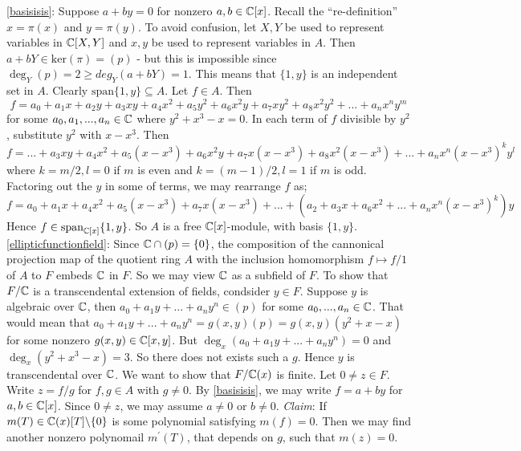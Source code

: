 \begin{solution}
	\eqref{basisisis}: Suppose $a+by = 0$ for nonzero $a,b \in \mathbb{C}[x]$. 
	Recall the ``re-definition'' $x = \pi(x)$ and $y = \pi(y)$. To 
	avoid confusion, let $X,Y$ be used to represent variables in 
	$\mathbb{C}[X,Y]$ and $x,y$ be used to represent variables in $A$. 
	Then $a+bY \in \text{ker}(\pi) = (p)$ - but this is impossible since 
	$\deg_Y(p) = 2 \geq deg_Y(a+bY) = 1$. This means that $\lbrace 1,y \rbrace$
	is an independent set in $A$. Clearly $\text{span} \lbrace 1,y \rbrace \subseteq A$.
	Let $f \in A$. Then $$f = a_0 + a_ 1x + a_2y + a_3xy + a_4 x^2 
	+ a_5y^2 + a_6x^2y + a_7xy^2 + a_8x^2y^2 + ... + a_nx^ny^m$$
	for some $a_0,a_1,...,a_n \in \mathbb{C}$ where $y^2+x^3 - x = 0$. 
	In each term of $f$ divisible by $y^2$, substitute $y^2$ with $x - x^3$. 
	Then $$f = ... + a_3xy + a_4 x^2 + a_5(x - x^3) + a_6x^2y + a_7x(x - x^3) 
	+ a_8x^2(x - x^3) + ... + a_nx^n(x - x^3)^ky^l$$
	where $k = m/2, l = 0$ if $m$ is even and $k = (m-1)/2, l = 1$ if $m$ is odd.
	Factoring out the $y$ in some of terms, we may rearrange $f$ as;
	$$f =  a_0 + a_ 1x +  a_4 x^2  + a_5(x - x^3)  + a_7x(x - x^3) + ... + 
	(a_2 +  a_3x  + a_6x^2 + ... +a_nx^n(x - x^3)^k)y $$
	Hence $f \in \text{span}_{\mathbb{C}[x]} \lbrace 1,y \rbrace$. 
	So $A$ is a free $\mathbb{C}[x]$-module, with basis $\{ 1, y \}$.\\

	\eqref{ellipticfunctionfield}: Since $\mathbb{C} \cap (p) = \lbrace 0 \rbrace $, 
	the composition of the cannonical projection map
	of the quotient ring $A$ with the inclusion homomorphism $f \mapsto f/1 $ of 
	$A$ to $F$ embeds $\mathbb{C} $ in $F$. So we may view $\mathbb{C} $ as a subfield of
	$F$. To show that $F/ \mathbb{C}$ is a transcendental extension of 
	fields, condsider $y\in F$. Suppose $y$ is algebraic over 
	$\mathbb{C} $, then $a_0 + a_1y + ... + a_ny^n \in (p)$ 
	for some $a_0,...,a_n \in \mathbb{C}$. That would mean 
	that $a_0 + a_1y + ... + a_ny^n = g(x,y)(p) = g(x,y)(y^2 + x - x)$ 
	for some nonzero $g(x,y) \in \mathbb{C}[x,y]$.
	But $\deg_x(a_0 + a_1y + ... + a_ny^n) = 0$ and 
	$\deg_x (y^2 +x^3 -x) = 3$. So there does not exists such a $g$.
	Hence $y$ is transcendental over $\mathbb{C}$.
	We want to show that $F/\mathbb{C}(x)$ is finite.
	Let $0 \neq z \in F$. Write $z = f/g$ for $f,g\in A$ with $g \neq 0$.
	By \eqref{basisisis}, we may write $f = a + by$ for 
	$a,b \in \mathbb{C}[x]$. 
	Since $0 \neq z$, we may assume $a\neq 0$ or  $b \neq 0$. 
	\textit{Claim}: If $m(T) \in \mathbb{C}(x) [T] \backslash \lbrace 0 \rbrace$ is 
	some polynomial satisfying $m(f) = 0$. Then we may find another 
	nonzero polynomail $m^{\prime}(T)$, that depends on $g$, such 
	that $m(z) = 0$. \\


\end{solution}
